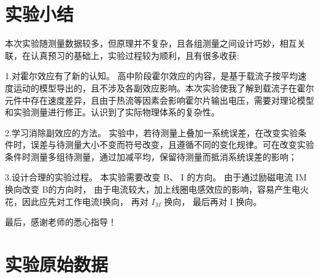 \documentclass[UTF8]{ctexart}
\begin{document}
\section{实验小结}

本次实验随测量数据较多，但原理并不复杂，且各组测量之间设计巧妙，相互关联，在认真预习的基础上，实验过程较为顺利，且有很多收获:

1.对霍尔效应有了新的认知。 高中阶段霍尔效应的内容，是基于载流子按平均速度运动的模型导出的，且不涉及各副效应影响。本次实验使我了解到载流子在霍尔元件中存在速度差异，且由于热流等因素会影响霍尔片输出电压，需要对理论模型和实验测量进行修正。认识到了实际物理体系的复杂性。

2.学习消除副效应的方法。 实验中，若待测量上叠加一系统误差，在改变实验条件时，误差与待测量大小不变而符号改变，且遵循不同的变化规律。可在改变实验条件时测量多组待测量，通过加减平均，保留待测量而抵消系统误差的影响；

3.设计合理的实验过程。 本实验需要改变 B、 I 的方向。 由于通过励磁电流 IM 换向改变 B的方向时， 由于电流较大，加上线圈电感效应的影响，容易产生电火花，因此应先对工作电流I换向， 再对 $I_M$ 换向， 最后再对 I 换向。

最后，感谢老师的悉心指导！



\section{实验原始数据}
\end{document}
